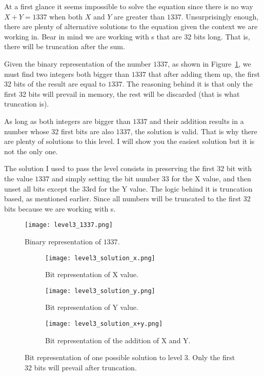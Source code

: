 At a first glance it seems impossible to solve the equation since there is no way $X + Y = 1337$ when both $X$ and $Y$ are greater than $1337$. Unsurprisingly enough, there are plenty of alternative solutions to the equation given the context we are working in. Bear in mind we are working with s that are 32 bits long. That is, there will be truncation after the sum. 

Given the binary representation of the number $1337$, as shown in Figure~\ref{fig:1337_binary}, we must find two integers both bigger than $1337$ that after adding them up, the first 32 bits of the result are equal to $1337$. The reasoning behind it is that only the first 32 bits will prevail in memory, the rest will be discarded (that is what truncation is). 

As long as both integers are bigger than $1337$ and their addition results in a number whose 32 first bits are  also $1337$, the solution is valid. That is why there are plenty of solutions to this level. I will show you the easiest solution but it is not the only one. 

The solution I used to pass the level consists in preserving the first 32 bit with the value $1337$ and simply setting the bit number 33 for the X value, and then unset all bits except the 33rd for the Y value. The logic behind it is truncation based, as mentioned earlier. Since all numbers will be truncated to the first 32 bits because we are working with s.

\begin{figure}[!h]
	\centering
	\texttt{[image: level3\_1337.png]}
	\caption{Binary representation of $1337$.}
	\label{fig:1337_binary}
\end{figure}

\begin{figure}
	\begin{subfigure}[t]{.5\textwidth}
		\centering
		\texttt{[image: level3\_solution\_x.png]}
		\caption{Bit representation of X value.}
	\end{subfigure}
	\begin{subfigure}[t]{.5\textwidth}
		\centering
		\texttt{[image: level3\_solution\_y.png]}
		\caption{Bit representation of Y value.}
	\end{subfigure}
	\begin{subfigure}[t]{\textwidth}
		\centering
		\texttt{[image: level3\_solution\_x+y.png]}
		\caption{Bit representation of the addition of X and Y.}
	\end{subfigure}
	\caption{Bit representation of one possible solution to level 3. Only the first 32 bits will prevail after truncation.}
\end{figure}

